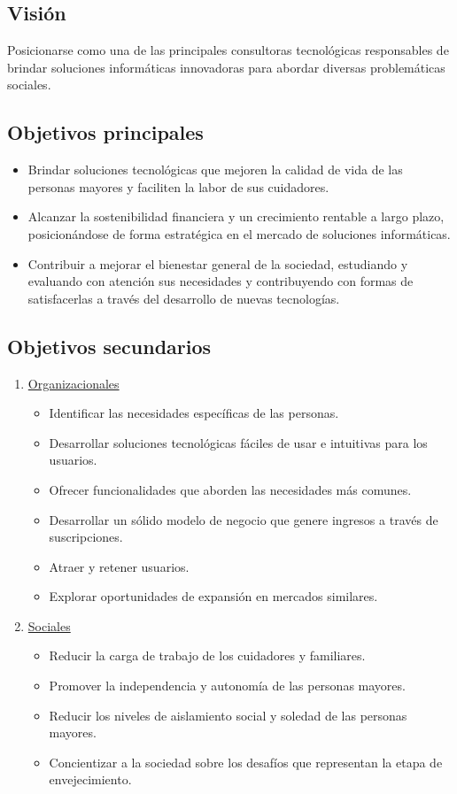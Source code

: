 \documentclass[a4paper,12pt]{article}
\begin{document}
    \subsection{Visión}
    \par Posicionarse como una de las principales consultoras tecnológicas responsables de brindar soluciones informáticas innovadoras para abordar diversas problemáticas sociales.
    \subsection{Objetivos principales}
    \begin{itemize}
        \item Brindar soluciones tecnológicas que mejoren la calidad de vida de las personas mayores y faciliten la labor de sus cuidadores.
        \item Alcanzar la sostenibilidad financiera y un crecimiento rentable a largo plazo, posicionándose de forma estratégica en el mercado de soluciones informáticas.
        \item Contribuir a mejorar el bienestar general de la sociedad, estudiando y evaluando con atención sus necesidades y contribuyendo con formas de satisfacerlas a través del desarrollo de nuevas tecnologías.
    \end{itemize}
    \subsection{Objetivos secundarios}
    \begin{enumerate}
        \item \underline{Organizacionales}
        \begin{itemize}
            \item Identificar las necesidades específicas de las personas.
            \item Desarrollar soluciones tecnológicas fáciles de usar e intuitivas para los usuarios.
            \item Ofrecer funcionalidades que aborden las necesidades más comunes.
            \item Desarrollar un sólido modelo de negocio que genere ingresos a través de suscripciones.
            \item Atraer y retener usuarios.
            \item Explorar oportunidades de expansión en mercados similares.
        \end{itemize}
        \item \underline{Sociales}
        \begin{itemize}
            \item Reducir la carga de trabajo de los cuidadores y familiares.
            \item Promover la independencia y autonomía de las personas mayores.
            \item Reducir los niveles de aislamiento social y soledad de las personas mayores.
            \item Concientizar a la sociedad sobre los desafíos que representan la etapa de envejecimiento.            
        \end{itemize}
    \end{enumerate}
\end{document}
